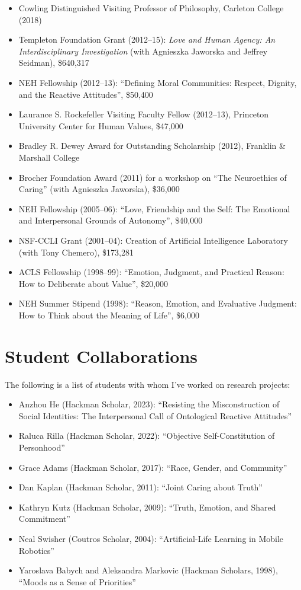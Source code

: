 \documentclass[11pt]{article}
\begin{document}
\begin{itemize}
  \item Cowling Distinguished Visiting Professor of Philosophy, Carleton College (2018)
  \item Templeton Foundation Grant (2012--15): \emph{Love and Human Agency: An Interdisciplinary Investigation} (with Agnieszka Jaworska and Jeffrey Seidman), \$640,317
  \item NEH Fellowship (2012--13): \enquote{Defining Moral Communities: Respect, Dignity, and the Reactive Attitudes}, \$50,400
  \item Laurance S. Rockefeller Visiting Faculty Fellow (2012--13), Princeton University Center for Human Values, \$47,000
  \item Bradley R. Dewey Award for Outstanding Scholarship (2012), Franklin \& {} Marshall College
  \item Brocher Foundation Award (2011) for a workshop on \enquote{The Neuroethics of Caring} (with Agnieszka Jaworska), \$36,000
  \item NEH Fellowship (2005--06): \enquote{Love, Friendship and the Self: The Emotional and Interpersonal Grounds of Autonomy}, \$40,000
  \item NSF-CCLI Grant (2001--04): Creation of Artificial Intelligence Laboratory (with Tony Chemero), \$173,281
  \item ACLS Fellowship (1998--99): \enquote{Emotion, Judgment, and Practical Reason: How to Deliberate about Value}, \$20,000
  \item NEH Summer Stipend (1998): \enquote{Reason, Emotion, and Evaluative Judgment: How to Think about the Meaning of Life}, \$6,000
\end{itemize}

\section[Students]{Student Collaborations}

The following is a list of students with whom I've worked on research projects:
\begin{itemize}
  \item Anzhou He (Hackman Scholar, 2023): \enquote{Resisting the Misconstruction of Social Identities: The Interpersonal Call of Ontological Reactive Attitudes}
  \item Raluca Rilla (Hackman Scholar, 2022): \enquote{Objective Self-Constitution of Personhood}
  \item Grace Adams (Hackman Scholar, 2017): \enquote{Race, Gender, and Community}
  \item Dan Kaplan (Hackman Scholar, 2011): \enquote{Joint Caring about Truth}
  \item Kathryn Kutz (Hackman Scholar, 2009): \enquote{Truth, Emotion, and Shared Commitment}
  \item Neal Swisher (Coutros Scholar, 2004): \enquote{Artificial-Life Learning in Mobile Robotics}
  \item Yaroslava Babych and Aleksandra Markovic (Hackman Scholars, 1998), \enquote{Moods as a Sense of Priorities}
\end{itemize}
\end{document}

